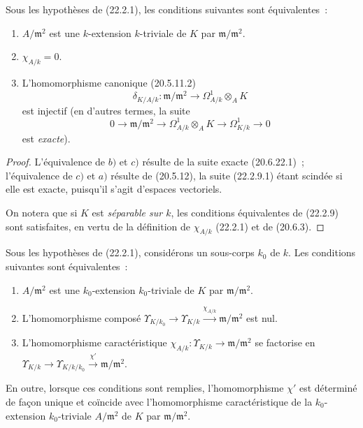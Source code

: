 \begin{proposition}[22.2.9]
\label{0.22.2.9-fr}
Sous les hypothèses de \textup{(22.2.1)}, les conditions suivantes sont
équivalentes~:
\begin{enumerate}
  \item[\textup{a)}] $A/\mathfrak m^2$ est une $k$-extension $k$-triviale de $K$ par
  $\mathfrak m/\mathfrak m^2$.
  \item[\textup{b)}] $\chi_{A/k}=0$.
  \item[\textup{c)}] L'homomorphisme canonique \textup{(20.5.11.2)}
  \[
    \delta_{K/A/k}:\mathfrak m/\mathfrak m^2
    \longrightarrow\Omega^1_{A/k}\otimes_AK
  \]
  est injectif \textup{(en d'autres termes, la suite}
  \begin{equation}
  \tag{22.2.9.1}
  \label{0.22.2.9.1-fr}
    0\longrightarrow\mathfrak m/\mathfrak m^2
    \longrightarrow\Omega^1_{A/k}\otimes_AK
    \longrightarrow\Omega^1_{K/k}\longrightarrow0
  \end{equation}
  \textup{est \emph{exacte})}.
\end{enumerate}
\end{proposition}

\begin{proof}
L'équivalence de $b)$ et $c)$ résulte de la suite exacte (20.6.22.1)~;
l'équivalence de $c)$ et $a)$ résulte de (20.5.12), la suite (22.2.9.1)
étant scindée si elle est exacte, puisqu'il s'agit d'espaces vectoriels.

On notera que si $K$ est \emph{séparable sur $k$}, les conditions
équivalentes de (22.2.9) sont satisfaites, en vertu de la définition de
$\chi_{A/k}$ (22.2.1) et de (20.6.3).
\end{proof}

\begin{corollary}[22.2.10]
\label{0.22.2.10-fr}
Sous les hypothèses de \textup{(22.2.1)}, considérons un sous-corps $k_0$ de $k$. Les
conditions suivantes sont équivalentes~:
\begin{enumerate}
  \item[\textup{a)}] $A/\mathfrak m^2$ est une $k_0$-extension $k_0$-triviale de $K$
  par $\mathfrak m/\mathfrak m^2$.
  \item[\textup{b)}] L'homomorphisme composé
  $\Upsilon_{K/k_0}\longrightarrow\Upsilon_{K/k}\xrightarrow{\chi_{A/k}}\mathfrak m/\mathfrak m^2$
  est nul.
  \item[\textup{c)}] L'homomorphisme caractéristique
  $\chi_{A/k}:\Upsilon_{K/k}\to\mathfrak m/\mathfrak m^2$ se factorise en
  $\Upsilon_{K/k}\longrightarrow\Upsilon_{K/k/k_0}\xrightarrow{\chi'}\mathfrak m/\mathfrak m^2$.
\end{enumerate}
En outre, lorsque ces conditions sont remplies, l'homomorphisme $\chi'$ est
déterminé de façon unique et coïncide avec l'homomorphisme caractéristique
de la $k_0$-extension $k_0$-triviale $A/\mathfrak m^2$ de $K$ par
$\mathfrak m/\mathfrak m^2$.
\end{corollary}

